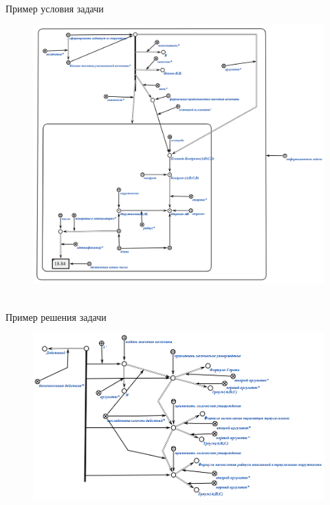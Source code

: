 \begin{frame}{\\Пример условия задачи}
	\topline
	\justifying
	\vspace{10mm}
	\begin{SCn}
		\begin{figure}[H]
			\includegraphics[scale=0.3]{./figures/sd_problems/value.png}
		\end{figure}
	\end{SCn}
\end{frame}


\begin{frame}{\\Пример решения задачи}
	\topline
	\justifying
	\vspace{10mm}
	\begin{SCn}
		\begin{figure}[H]
			\includegraphics[scale=0.47]{./figures/sd_problems/solution.png}
		\end{figure}
	\end{SCn}
\end{frame}